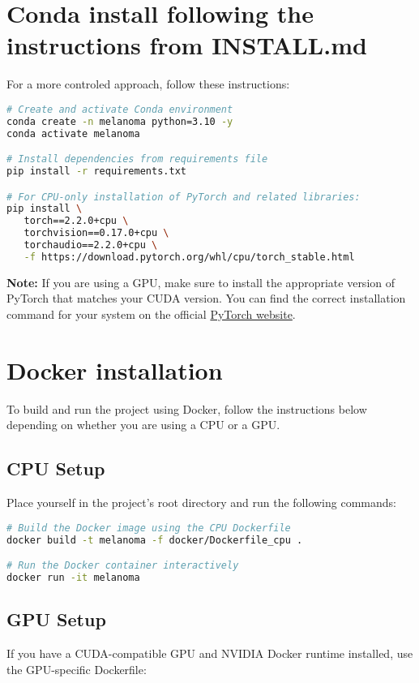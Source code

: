 \section{Conda install following the instructions from INSTALL.md}\label{subsec:reflinks}
For a more controled approach, follow these instructions:

\begin{lstlisting}[language=bash, caption={Environment setup using Conda and pip}, label=list:full_env_setup]
# Create and activate Conda environment
conda create -n melanoma python=3.10 -y
conda activate melanoma

# Install dependencies from requirements file
pip install -r requirements.txt

# For CPU-only installation of PyTorch and related libraries:
pip install \
   torch==2.2.0+cpu \
   torchvision==0.17.0+cpu \
   torchaudio==2.2.0+cpu \
   -f https://download.pytorch.org/whl/cpu/torch_stable.html
\end{lstlisting}

\noindent
\textbf{Note:} If you are using a GPU, make sure to install the appropriate version of PyTorch that matches your CUDA version.  
You can find the correct installation command for your system on the official \href{https://pytorch.org/get-started/locally/}{PyTorch website}.


\section{Docker installation}
To build and run the project using Docker, follow the instructions below depending on whether you are using a CPU or a GPU.

\subsection*{CPU Setup}
Place yourself in the project’s root directory and run the following commands:

\begin{lstlisting}[language=bash, caption={Build and run Docker container (CPU version)}, label=list:docker_cpu]
# Build the Docker image using the CPU Dockerfile
docker build -t melanoma -f docker/Dockerfile_cpu .

# Run the Docker container interactively
docker run -it melanoma
\end{lstlisting}

\subsection*{GPU Setup}
If you have a CUDA-compatible GPU and NVIDIA Docker runtime installed, use the GPU-specific Dockerfile:

